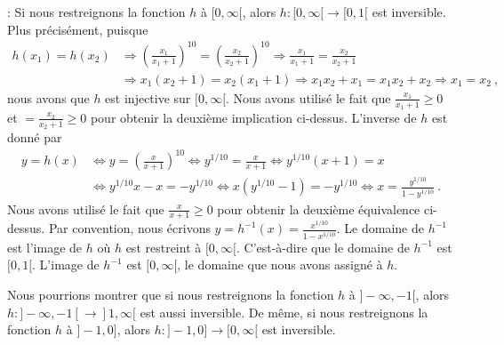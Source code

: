 {: Si nous restreignons la fonction $h$ à
$[0,\infty[$, alors $h:[0,\infty[ \rightarrow [0,1[$ est inversible.
Plus précisément, puisque
\begin{align*}
h(x_1) = h(x_2) &\Rightarrow \left( \frac{x_1}{x_1+1} \right)^{10} =
\left( \frac{x_2}{x_2+1} \right)^{10}
\Rightarrow \frac{x_1}{x_1+1} = \frac{x_2}{x_2+1} \\
&\Rightarrow x_1(x_2+1) = x_2(x_1+1)
\Rightarrow x_1 x_2 + x_1 = x_1 x_2 + x_2
\Rightarrow x_1 = x_2 \ ,
\end{align*}
nous avons que $h$ est injective sur $[0, \infty[$.  Nous avons utilisé le fait
que $\displaystyle \frac{x_1}{x_1+1} \geq 0$ et
$\displaystyle = \frac{x_2}{x_2+1} \geq 0$ pour obtenir la deuxième
implication ci-dessus.  L'inverse de $h$ est donné par
\begin{align*}
y = h(x) & \Leftrightarrow y = \left( \frac{x}{x+1} \right)^{10}
\Leftrightarrow y^{1/10} = \frac{x}{x+1} \Leftrightarrow 
y^{1/10} (x+1) = x\\
&\Leftrightarrow y^{1/10} x - x = -y^{1/10} \Leftrightarrow
x( y^{1/10} - 1) = -y^{1/10}
\Leftrightarrow x = \frac{y^{1/10}}{1 - y^{1/10}} \ .
\end{align*}
Nous avons utilisé le fait que $\displaystyle \frac{x}{x+1} \geq 0$ pour
obtenir la deuxième équivalence ci-dessus.  Par convention, nous écrivons
$\displaystyle y=h^{-1}(x)= \frac{x^{1/10}}{1 - x^{1/10}}$.  Le
domaine de $h^{-1}$ est l'image de $h$ où $h$ est restreint à
$[0,\infty[$.  C'est-à-dire que le domaine de $h^{-1}$ est $[0,1[$.
L'image de $h^{-1}$ est $[0,\infty[$, le domaine que nous avons assigné à
$h$.

Nous pourrions montrer que si nous restreignons la fonction $h$ à
$]-\infty,-1[$, alors $h:]-\infty,-1[ \rightarrow ]1,\infty[$ est
aussi inversible.  De même, si nous restreignons la fonction $h$ à $]-1,0]$,
alors $h:]-1,0] \rightarrow [0,\infty[$ est inversible.
}

\compileSOL{\SOLUb}{\ref{2Q14}}{
\[
(f\circ g)(x) = f(g(x)) = \sqrt{g^2(x) - 1}
= \sqrt{ (\sqrt{x^2+1})^2 - 1}
= \sqrt{ (x^2+1) - 1} = \sqrt{x^2} = |x| \ .
\]
}



